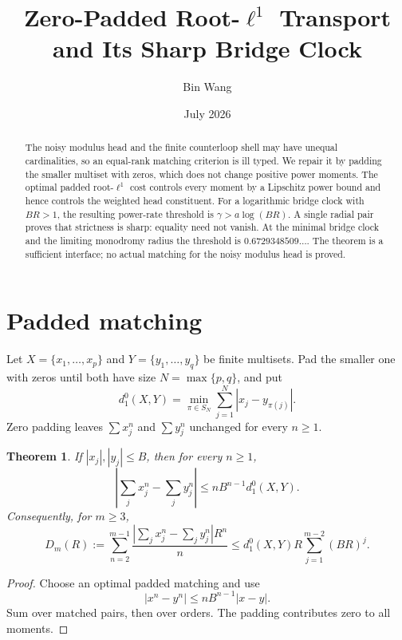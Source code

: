 \documentclass[11pt]{article}
\title{Zero-Padded Root-\(\ell^1\) Transport and Its Sharp Bridge Clock}
\author{Bin Wang}\date{July 2026}
\newtheorem{theorem}{Theorem}[section]
\theoremstyle{remark}\newtheorem{remark}[theorem]{Remark}
\begin{document}
\maketitle
\begin{abstract}
The noisy modulus head and the finite counterloop shell may have unequal
cardinalities, so an equal-rank matching criterion is ill typed.  We repair
it by padding the smaller multiset with zeros, which does not change positive
power moments.  The optimal padded root-$\ell^1$ cost controls every moment
by a Lipschitz power bound and hence controls the weighted head constituent.
For a logarithmic bridge clock with $BR>1$, the resulting power-rate
threshold is $\gamma>a\log(BR)$.  A single radial pair proves that strictness
is sharp: equality need not vanish.  At the minimal bridge clock and the
limiting monodromy radius the threshold is $0.6729348509\ldots$.  The theorem
is a sufficient interface; no actual matching for the noisy modulus head is
proved.
\end{abstract}

\section{Padded matching}
Let $X=\{x_1,\ldots,x_p\}$ and $Y=\{y_1,\ldots,y_q\}$ be finite multisets.
Pad the smaller one with zeros until both have size $N=\max\{p,q\}$, and put
\[
 d_1^0(X,Y)=\min_{\pi\in S_N}\sum_{j=1}^N|x_j-y_{\pi(j)}|.
\]
Zero padding leaves $\sum x_j^n$ and $\sum y_j^n$ unchanged for every
$n\ge1$.

\begin{theorem}\label{thm:transport}
If $|x_j|,|y_j|\le B$, then for every $n\ge1$,
\[
 \left|\sum_jx_j^n-\sum_jy_j^n\right|
 \le nB^{n-1}d_1^0(X,Y).
\]
Consequently, for $m\ge3$,
\[
 D_m(R):=\sum_{n=2}^{m-1}
 \frac{\left|\sum_jx_j^n-\sum_jy_j^n\right|R^n}{n}
 \le d_1^0(X,Y)R\sum_{j=1}^{m-2}(BR)^j.
\]
\end{theorem}
\begin{proof}
Choose an optimal padded matching and use
\[
 |x^n-y^n|\le nB^{n-1}|x-y|.
\]
Sum over matched pairs, then over orders.  The padding contributes zero to
all moments.
\end{proof}
\end{document}

